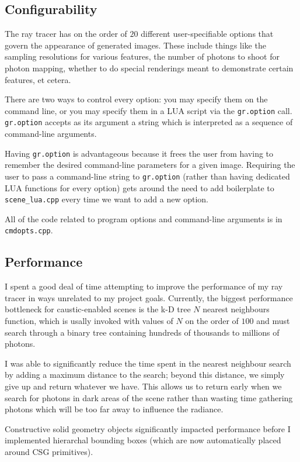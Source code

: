 \documentclass{article}
\begin{document}
\subsection{Configurability}

The ray tracer has on the order of $20$ different user-specifiable options that
govern the appearance of generated images. These include things like the sampling
resolutions for various features, the number of photons to shoot for photon mapping,
whether to do special renderings meant to demonstrate certain features, et
cetera.

There are two ways to control every option: you may specify them on the
command line, or you may specify them in a LUA script via the {\tt gr.option}
call. {\tt gr.option} accepts as its argument a string which is interpreted as a
sequence of command-line arguments.

Having {\tt gr.option} is advantageous because it frees the user from having to
remember the desired command-line parameters for a given image. Requiring the
user to pass a command-line string to {\tt gr.option} (rather than having
dedicated LUA functions for every option) gets around the need to
add boilerplate to {\tt scene\_lua.cpp} every time we want to add a new
option.

All of the code related to program options and command-line arguments is in
{\tt cmdopts.cpp}.

\subsection{Performance}

I spent a good deal of time attempting to improve the performance of my ray
tracer in ways unrelated to my project goals. Currently, the biggest performance
bottleneck for caustic-enabled scenes is the k-D tree $N$ nearest neighbours
function, which is usally invoked with values of $N$ on the order of $100$ and
must search through a binary tree containing hundreds of thousands to millions
of photons.

I was able to significantly reduce the time spent in the nearest neighbour
search by adding a maximum distance to the search; beyond this distance, we simply give up
and return whatever we have. This allows us to return early when we search for
photons in dark areas of the scene rather than wasting time gathering photons
which will be too far away to influence the radiance.

Constructive solid geometry objects significantly impacted performance before I
implemented hierarchal bounding boxes (which are now automatically placed around
CSG primitives).
\end{document}
